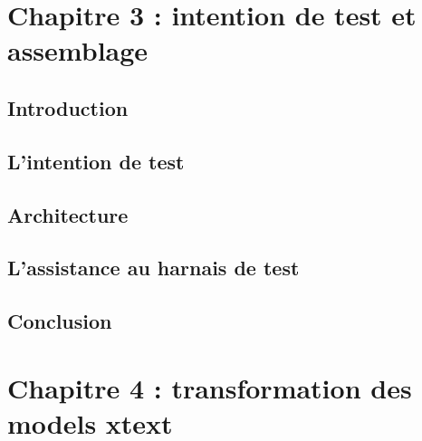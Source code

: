 \documentclass[
10pt, %
a4paper, %
oneside, %
headinclude,footinclude, %
BCOR5mm, %
]{report}
\begin{document}
										  
										  
		\newpage 
		\chapter{Chapitre 3 : intention de test et assemblage}
		\minitoc  
		\section{Introduction}
		\lipsum[5] %
		\section{L'intention de test}
		\lipsum[5] %
		\section{Architecture}
		\lipsum[5] %
		\section{L'assistance au harnais de test}
		\lipsum[5] %
		\section{Conclusion}
		\lipsum[10]	
										  
										  
										  
		\newpage 
		\chapter{Chapitre 4 : transformation des models xtext}
		\minitoc  
\end{document}
